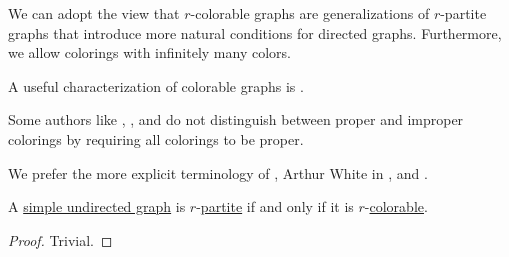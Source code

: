 \begin{comments}
  \item We can adopt the view that \( r \)-colorable graphs are generalizations of \( r \)-partite graphs that introduce more natural conditions for directed graphs. Furthermore, we allow colorings with infinitely many colors.

  \item A useful characterization of colorable graphs is .

  \item Some authors like , ,  and  do not distinguish between proper and improper colorings by requiring all colorings to be proper.

  We prefer the more explicit terminology of , Arthur White in \cite[590]{Rosen1999},  and .
\end{comments}

\begin{proposition}\label{thm:k_colorable_iff_multipartite}
  A \hyperref[def:undirected_graph]{simple undirected graph} is \( r \)-\hyperref[def:multipartite_graph]{partite} if and only if it is \( r \)-\hyperref[def:graph_coloring/colorable]{colorable}.
\end{proposition}
\begin{proof}
  Trivial.
\end{proof}

